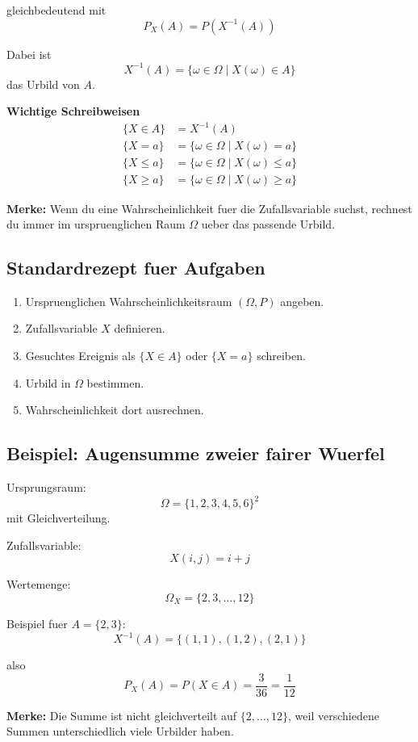 \documentclass[a4paper,11pt]{article}
\begin{document}
gleichbedeutend mit
\[
P_X(A) = P(X^{-1}(A))
\]

Dabei ist
\[
X^{-1}(A) = \{\omega \in \Omega \mid X(\omega) \in A\}
\]
das Urbild von $A$.

\textbf{Wichtige Schreibweisen}
\begin{align*}
\{X \in A\} &= X^{-1}(A) \\
\{X = a\} &= \{\omega \in \Omega \mid X(\omega)=a\} \\
\{X \le a\} &= \{\omega \in \Omega \mid X(\omega)\le a\} \\
\{X \ge a\} &= \{\omega \in \Omega \mid X(\omega)\ge a\}
\end{align*}

\textbf{Merke:}
Wenn du eine Wahrscheinlichkeit fuer die Zufallsvariable suchst, rechnest du immer im urspruenglichen Raum $\Omega$ ueber das passende Urbild.

\subsection{Standardrezept fuer Aufgaben}
\begin{enumerate}
  \item Urspruenglichen Wahrscheinlichkeitsraum $(\Omega,P)$ angeben.
  \item Zufallsvariable $X$ definieren.
  \item Gesuchtes Ereignis als $\{X \in A\}$ oder $\{X=a\}$ schreiben.
  \item Urbild in $\Omega$ bestimmen.
  \item Wahrscheinlichkeit dort ausrechnen.
\end{enumerate}

\subsection{Beispiel: Augensumme zweier fairer Wuerfel}
Ursprungsraum:
\[
\Omega = \{1,2,3,4,5,6\}^2
\]
mit Gleichverteilung.

Zufallsvariable:
\[
X(i,j)=i+j
\]

Wertemenge:
\[
\Omega_X=\{2,3,\dots,12\}
\]

Beispiel fuer $A=\{2,3\}$:
\[
X^{-1}(A)=\{(1,1),(1,2),(2,1)\}
\]

also
\[
P_X(A)=P(X\in A)=\frac{3}{36}=\frac{1}{12}
\]

\textbf{Merke:}
Die Summe ist nicht gleichverteilt auf $\{2,\dots,12\}$, weil verschiedene Summen unterschiedlich viele Urbilder haben.
\end{document}

